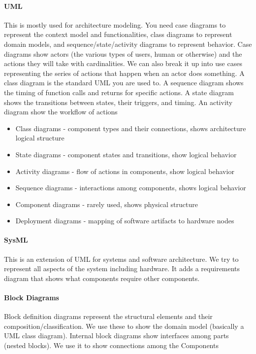 \documentclass{article}
\begin{document}
\paragraph{UML} %
\label{par:uml}
This is mostly used for architecture modeling. You need case diagrams to represent the context model and functionalities, class diagrams to represent domain models, and sequence/state/activity diagrams to represent behavior. Case diagrams show actors (the various types of users, human or otherwise) and the actions they will take with cardinalities. We can also break it up into use cases representing the series of actions that happen when an actor does something. A class diagram is the standard UML you are used to. A sequence diagram shows the timing of function calls and returns for specific actions. A state diagram shows the transitions between states, their triggers, and timing. An activity diagram show the workflow of actions

\begin{itemize}
    \item Class diagrams - component types and their connections, shows architecture logical structure
    \item State diagrams - component states and transitions, show logical behavior
    \item Activity diagrams - flow of actions in components, show logical behavior
    \item Sequence diagrams - interactions among components, shows logical behavior
    \item Component diagrams - rarely used, shows physical structure
    \item Deployment diagrams - mapping of software artifacts to hardware nodes
\end{itemize}


\paragraph{SysML} %
\label{par:sysml}
This is an extension of UML for systems and software architecture. We try to represent all aspects of the system including hardware. It adds a requirements diagram that shows what components require other components.

\paragraph{Block Diagrams} %
\label{par:block_diagrams}
Block definition diagrams represent the structural elements and their composition/classification. We use these to show the domain model (basically a UML class diagram). Internal block diagrams show interfaces among parts (nested blocks). We use it to show connections among the Components
\end{document}
